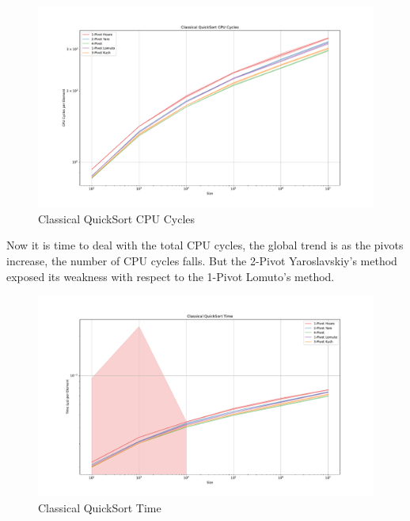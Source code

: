 \documentclass{article}
\begin{document}
\begin{figure}[H]
    \hypertarget{fig:classicalcpucycles}{}
    \caption{Classical QuickSort CPU Cycles}
    \centering
    \hspace*{-0.27\textwidth}
    \includegraphics[width=1.5\textwidth]{Classical QuickSort CPU Cycles.pdf}
\end{figure}

Now it is time to deal with the total CPU cycles, the global trend is as the pivots increase, the number of CPU cycles falls.
But the 2-Pivot Yaroslavskiy's method exposed its weakness with respect to the 1-Pivot Lomuto's method. 

\begin{figure}[H]
    \hypertarget{fig:classicaltime}{}
    \caption{Classical QuickSort Time}
    \centering
    \hspace*{-0.27\textwidth}
    \includegraphics[width=1.5\textwidth]{Classical QuickSort Time.pdf}
\end{figure}
\end{document}
